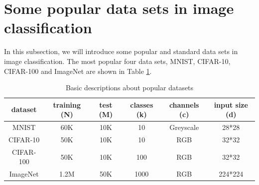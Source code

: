 {\break
\section{Some popular data sets in image classification}
In this subsection, we will introduce some popular and standard data sets
in image classification. The most popular four data sets, MNIST, CIFAR-10, CIFAR-100 and ImageNet are shown in Table \ref{popular_dataset}.

\begin{table}[H]
	\centering
	\begin{tabular}{|c|c|c|c|c|c|}
		\hline
		dataset &  training (N) & test (M)   & classes (k) & channels (c)& input size (d)\\\hline
		MNIST	&	60K	&	10K	&	10	& Greyscale & 28*28  \\\hline
		CIFAR-10	&	50K 	&	10K	&	10 & RGB & 32*32   \\\hline
		CIFAR-100	&	50K 	&	10K	&	100 & RGB & 32*32   \\\hline
		ImageNet	&	1.2M 	&	50K	&	1000 &	RGB & 224*224  \\\hline
	\end{tabular}
	\caption{Basic descriptions about popular datasets }
	\label{popular_dataset}
\end{table}

\break
}
